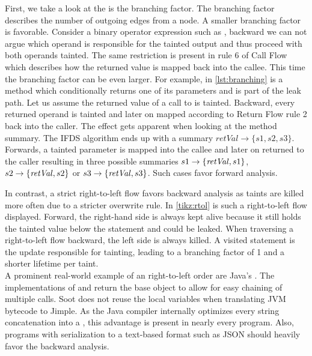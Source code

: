 \documentclass[../draft.tex]{subfiles}
\begin{document}
    First, we take a look at the is the branching factor. The branching factor describes the number of outgoing edges from a node. A smaller branching factor is favorable.   
    Consider a binary operator expression such as , backward we can not argue which operand is responsible for the tainted output and thus proceed with both operands tainted.
    The same restriction is present in rule 6 of Call Flow which describes how the returned value is mapped back into the callee.
    This time the branching factor can be even larger.
    For example, in \autoref{lst:branching} is a method which conditionally returns one of its parameters and is part of the leak path.
    Let us assume the returned value of a call to  is tainted. Backward, every returned operand is tainted and later on mapped according to Return Flow rule 2 back into the caller.
    The effect gets apparent when looking at the method summary.
    The IFDS algorithm ends up with a summary $\mathit{retVal} \rightarrow \{s1, s2, s3\}$. 
    Forwards, a tainted parameter is mapped into the callee and later on returned to the caller resulting in three possible summaries  $s1 \rightarrow \mathit\{\mathit{retVal}, s1\}$, $s2 \rightarrow \mathit\{\mathit{retVal}, s2\}$ or $s3 \rightarrow \mathit\{\mathit{retVal}, s3\}$.
    Such cases favor forward analysis.

    In contrast, a strict right-to-left flow favors backward analysis as taints are killed more often due to a stricter overwrite rule. 
    In \autoref{tikz:rtol} is such a right-to-left flow displayed. 
    Forward, the right-hand side is always kept alive because it still holds the tainted value below the statement and could be leaked. 
    When traversing a right-to-left flow backward, the left side is always killed. 
    A visited statement is the update responsible for tainting, leading to a branching factor of 1 and a shorter lifetime per taint.\\
    A prominent real-world example of an right-to-left order are Java's . The implementations of  and  return the base object to allow for easy chaining of multiple calls. Soot does not reuse the local variables when translating JVM bytecode to Jimple. As the Java compiler internally optimizes every string concatenation into a , this advantage is present in nearly every program. Also, programs with serialization to a text-based format such as JSON should heavily favor the backward analysis.
\end{document}

